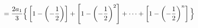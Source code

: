 \documentclass[preview]{standalone}
\begin{document}
\begin{align*}
\special{dvisvgm:raw <g id='unique000'>}=\frac{2a_1}{3}\Big\{\left[1-\left(-\frac{1}{2}\right)\right]+\left[1-\left(-\frac{1}{2}\right)^2\right]+\cdots \special{dvisvgm:raw </g>}\special{dvisvgm:raw <g id='unique001'>}+\left[1-\left(-\frac{1}{2}\right)^n\right]\Big\}\special{dvisvgm:raw </g>}
\end{align*}
\end{document}
